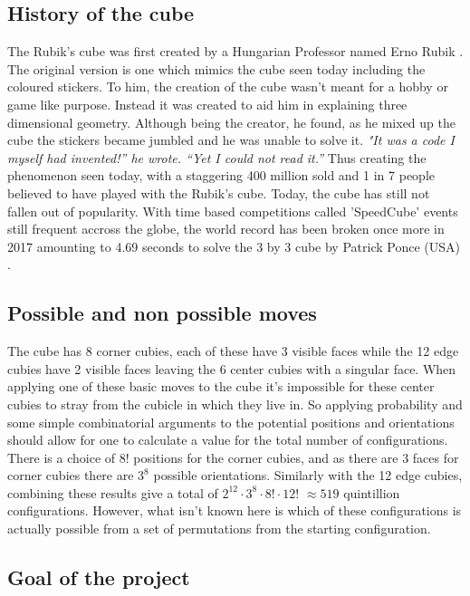 \documentclass{article}
\begin{document}
\subsection{History of the cube}

The Rubik's cube was first created by a Hungarian Professor named Erno Rubik \cite{History}. The original version is one which mimics the cube seen today including the coloured stickers. To him, the creation of the cube wasn't meant for a hobby or game like purpose. Instead it was created to aid him in explaining three dimensional geometry. Although being the creator, he found, as he mixed up the cube the stickers became jumbled and he was unable to solve it.
\textit{"It was a code I myself had invented!” he wrote. “Yet I could not read it.”}
Thus creating the phenomenon seen today, with a staggering 400 million sold and 1 in 7 people believed to have played with the Rubik's cube. Today, the cube has still not fallen out of popularity. With time based competitions called 'SpeedCube' events still frequent accross the globe, the world record has been broken once more in 2017 amounting to 4.69 seconds to solve the 3 by 3 cube by Patrick Ponce (USA) \cite{Record}.
\subsection{Possible and non possible moves}

The cube has 8 corner cubies, each of these have 3 visible faces while the 12 edge cubies have 2 visible faces leaving the 6 center cubies with a singular face. When applying one of these basic moves to the cube it's impossible for these center cubies to stray from the cubicle in which they live in.
So applying probability and some simple combinatorial arguments to the potential positions and orientations should allow for one to calculate a value for the total number of configurations.
There is a choice of 8! positions for the corner cubies, and as there are 3 faces for corner cubies there are $3^8$ possible orientations. Similarly with the 12 edge cubies, combining these results give a total of $2^{12} \cdot 3^8 \cdot 8! \cdot 12!$ $\approx 519$ quintillion configurations.
However, what isn't known here is which of these configurations is actually possible from a set of permutations from the starting configuration.

\subsection{Goal of the project}
\end{document}
